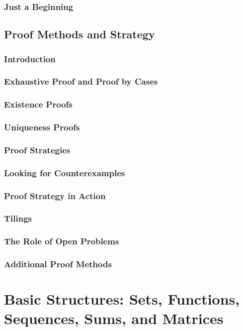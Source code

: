 \documentclass[11pt]{book}
\begin{document}
  \subsection{Just a Beginning}
  
 \section{Proof Methods and Strategy}
  \subsection{Introduction}
  \subsection{Exhaustive Proof and Proof by Cases}
  \subsection{Existence Proofs}
  \subsection{Uniqueness Proofs}
  \subsection{Proof Strategies}
  \subsection{Looking for Counterexamples}
  \subsection{Proof Strategy in Action}
  \subsection{Tilings}
  \subsection{The Role of Open Problems}
  \subsection{Additional Proof Methods}
  

\chapter{Basic Structures: Sets, Functions, Sequences, Sums, and Matrices}
\end{document}
